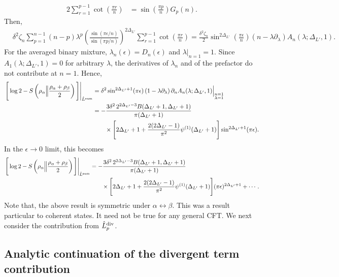 \documentclass[11pt]{article}
\newcommand{\ep}{\epsilon}
\newcommand{\p}{\partial}
\newcommand{\nn}{\nonumber}
\newcommand{\lb}{\left(}
\newcommand{\rb}{\right)}
\begin{document}
\begin{align}
    2\sum_{r=1}^{p-1}\cot\lb\frac{\pi r}{n}\rb
    &=
    \sin\lb\frac{\pi p}{n}\rb G_p(n).
\end{align}
Then,
\begin{align}
    &\delta^2\zeta_n
    \sum_{p=1}^{n-1}(n-p)\lambda^p
    \lb
    \frac{\sin(\pi\ep/n)}
    {\sin(\pi p/n)}
    \rb^{2\Delta_{L'}}
    \sum_{r=1}^{p-1}\cot\lb\frac{\pi r}{n}\rb
    =
    \frac{\delta^2\zeta_n}{2}
    \sin^{2\Delta_{L'}}\lb\frac{\pi\ep}{n}\rb
    \lb n-\lambda\p_\lambda\rb
    A_n(\lambda;\Delta_{L'},1).
\end{align}
For the averaged binary mixture, $\lambda_n(\ep)=D_n(\ep)$ and
$\lambda|_{n=1}=1$. Since $A_1(\lambda;\Delta_{L'},1)=0$ for
arbitrary $\lambda$, the derivatives of $\lambda_n$ and of the
prefactor do not contribute at $n=1$. Hence,
\begin{align}
    \left.
    \Bigg[
    \log 2-
    S\lb
    \rho_\alpha
    \Big\|
    \frac{\rho_\alpha+\rho_\beta}{2}
    \rb
    \Bigg]
    \right|_{\hat L^{\rm sum}}
    &=
    \delta^2\sin^{2\Delta_{L'}+1}(\pi\ep)
    \lb1-\lambda\p_\lambda\rb
    \p_n A_n(\lambda;\Delta_{L'},1)
    \Big|_{\substack{n=1\\\lambda=1}}
    \nn\\
    &=
    -\frac{
    3\delta^2\,2^{2\Delta_{L'}-3}
    B(\Delta_{L'}+1,\Delta_{L'}+1)
    }{
    \pi(\Delta_{L'}+1)
    }
    \nn\\
    &\qquad\times
    \Bigg[
    2\Delta_{L'}+1
    +
    \frac{2(2\Delta_{L'}-1)}{\pi^2}
    \psi^{(1)}(\Delta_{L'}+1)
    \Bigg]
    \sin^{2\Delta_{L'}+1}(\pi\ep).
\end{align}
In the $\ep\to0$ limit, this becomes
\begin{align}
    \left.
    \Bigg[
    \log 2-
    S\lb
    \rho_\alpha
    \Big\|
    \frac{\rho_\alpha+\rho_\beta}{2}
    \rb
    \Bigg]
    \right|_{\hat L^{\rm sum}}
    &=
    -\frac{
    3\delta^2\,2^{2\Delta_{L'}-3}
    B(\Delta_{L'}+1,\Delta_{L'}+1)
    }{
    \pi(\Delta_{L'}+1)
    }
    \nn\\
    &\qquad\times
    \Bigg[
    2\Delta_{L'}+1
    +
    \frac{2(2\Delta_{L'}-1)}{\pi^2}
    \psi^{(1)}(\Delta_{L'}+1)
    \Bigg]
    (\pi\ep)^{2\Delta_{L'}+1}
    +\cdots .
\end{align}
Note that, the above result is symmetric under $\alpha \leftrightarrow \beta$. This was a result particular to coherent states. It need not be true for any general CFT. 
We next consider the contribution from $\hat L_p^{\rm div}$.
\subsection{Analytic continuation of the divergent term contribution}
\end{document}
